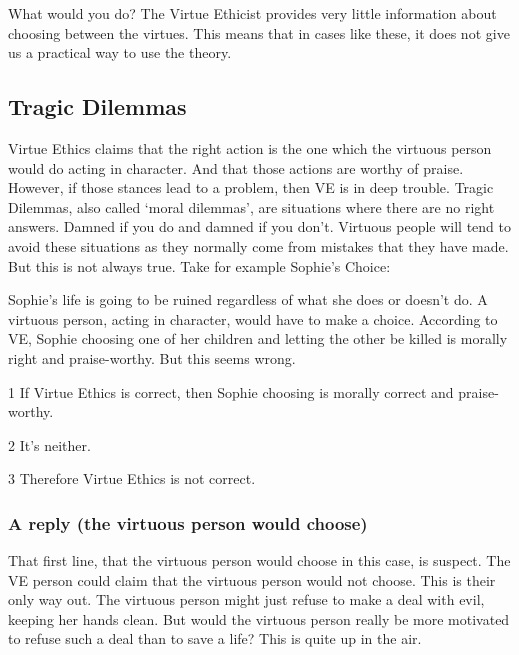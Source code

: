 What would you do? The Virtue Ethicist provides very little information about choosing between the virtues. This means that in cases like these, it does not give us a practical way to use the theory.
\subsection{Tragic Dilemmas}

Virtue Ethics claims that the right action is the one which the virtuous person would do acting in character. And that those actions are worthy of praise. However, if those stances lead to a problem, then VE is in deep trouble. Tragic Dilemmas, also called ‘moral dilemmas’, are situations where there are no right answers. Damned if you do and damned if you don’t. Virtuous people will tend to avoid these situations as they normally come from mistakes that they have made. But this is not always true. Take for example Sophie’s Choice:


Sophie’s life is going to be ruined regardless of what she does or doesn’t do. A virtuous person, acting in character, would have to make a choice. According to VE, Sophie choosing one of her children and letting the other be killed is morally right and praise-worthy. But this seems wrong.
\begin{earg}
    \item[1] If Virtue Ethics is correct, then Sophie choosing is morally correct and praise-worthy.
    \item[2] It’s neither.
    \item[3] Therefore Virtue Ethics is not correct.
\end{earg}
\subsubsection{A reply (the virtuous person would choose)}

That first line, that the virtuous person would choose in this case, is suspect. The VE person could claim that the virtuous person would not choose. This is their only way out. The virtuous person might just refuse to make a deal with evil, keeping her hands clean. But would the virtuous person really be more motivated to refuse such a deal than to save a life? This is quite up in the air.
